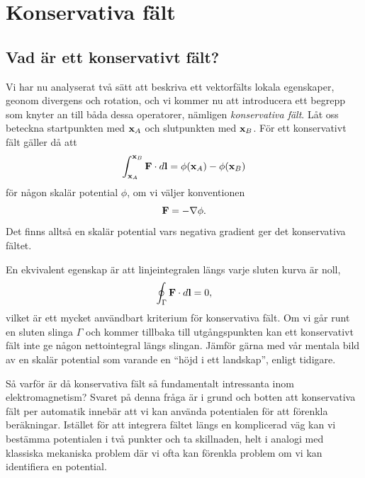 \section{Konservativa f{\"a}lt}
\subsection{Vad {\"a}r ett konservativt f{\"a}lt?}
Vi har nu analyserat tv{\aa} s{\"a}tt att beskriva ett vektorf{\"a}lts lokala
egenskaper, geonom divergens och rotation, och vi kommer nu att introducera
ett begrepp som knyter an till b{\aa}da dessa operatorer, n{\"a}mligen
{\it konservativa f{\"a}lt}.
\noindent
L{\aa}t oss beteckna startpunkten med ${\bf x}_A$ och slutpunkten med
${\bf x}_B$. F{\"o}r ett konservativt f{\"a}lt g{\"a}ller d{\aa} att
$$
  \int^{{\bf x}_B}_{{\bf x}_A}{\bf F}\cdot d{\bf l}=\phi({\bf x}_A)-\phi({\bf x}_B)
$$
f{\"o}r n{\aa}gon skal{\"a}r potential $\phi$, om vi v{\"a}ljer
konventionen
$$
  {\bf F}=-\nabla\phi.
$$
Det finns allts{\aa} en skal{\"a}r potential vars negativa gradient ger det
konservativa f{\"a}ltet.

En ekvivalent egenskap {\"a}r att linjeintegralen l{\"a}ngs varje sluten kurva
{\"a}r noll,
$$
  \oint_{\Gamma}{\bf F}\cdot d{\bf l}=0,
$$
vilket {\"a}r ett mycket anv{\"a}ndbart kriterium f{\"o}r konservativa f{\"a}lt.
Om vi g{\aa}r runt en sluten slinga $\Gamma$ och kommer tillbaka till
utg{\aa}ngspunkten kan ett konservativt f{\"a}lt inte ge n{\aa}gon
nettointegral l{\"a}ngs slingan. J{\"a}mf{\"o}r g{\"a}rna med v{\aa}r mentala
bild av en skal{\"a}r potential som varande en ``h{\"o}jd i ett landskap'',
enligt tidigare.

S{\aa} varf{\"o}r {\"a}r d{\aa} konservativa f{\"a}lt s{\aa} fundamentalt
intressanta inom elektromagnetism? Svaret p{\aa} denna fr{\aa}ga {\"a}r i
grund och botten att konservativa f{\"a}lt per automatik inneb{\"a}r att vi
kan anv{\"a}nda potentialen f{\"o}r att f{\"o}renkla ber{\"a}kningar.
Ist{\"a}llet f{\"o}r att integrera f{\"a}ltet l{\"a}ngs en komplicerad v{\"a}g
kan vi best{\"a}mma potentialen i tv{\aa} punkter och ta skillnaden, helt i
analogi med klassiska mekaniska problem d{\"a}r vi ofta kan f{\"o}renkla
problem om vi kan identifiera en potential.

